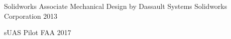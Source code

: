

\begin{cvhonors}

  \cvhonor
    {Solidworks Associate} %
    {Mechanical Design by Dassault Systems Solidworks Corporation} %
    {} %
    {2013} %

  \cvhonor
    {sUAS Pilot} %
    {FAA} %
    {} %
    {2017} %

\end{cvhonors}

